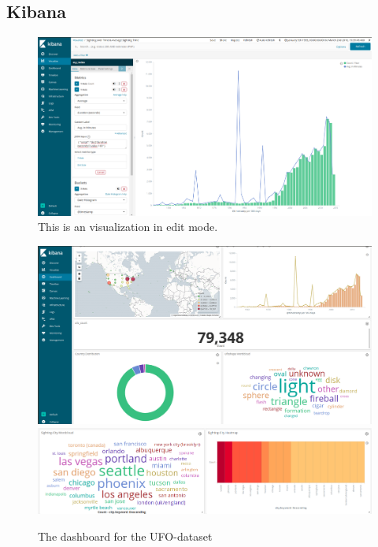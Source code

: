 \documentclass[bibliography=totoc]{article}
\begin{document}
\subsection{Kibana}
\begin{figure}
   \includegraphics[height=0.5\textwidth]{kibana_script.png} 
   \caption{\label{json_script}This is an visualization in edit mode.}
\end{figure}
\begin{figure}
   \includegraphics[height=0.5\textwidth]{dashboard1.png} 
   \includegraphics[height=0.242\textwidth]{dashboard2.png} 
   \caption{\label{ufo_dashboard}The dashboard for the UFO-dataset}
\end{figure}
\end{document}
